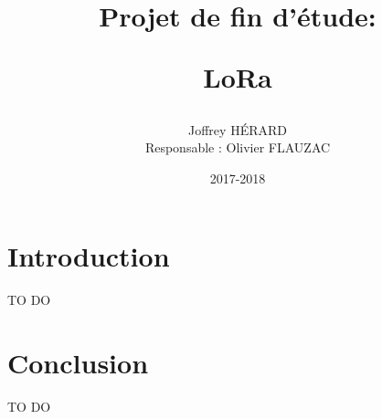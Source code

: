 \documentclass[11pt]{article}
\begin{document}
\lstset{language=Java}
 \makeatletter
\def\maketitle{%
  \null
  \thispagestyle{empty}%
   \vfill
  \begin{center}\leavevmode
    \normalfont
    {\Huge \@title\par}%
    \vskip 3cm
    {\Large \@author\par}%
    \vskip 1cm
    {\Large \@date\par}%
  \end{center}%
  \vfill
  \null
  \cleardoublepage
  }
\makeatother
\title{\begin{center}Projet de fin d'étude:\end{center} LoRa }
\author{ Joffrey HÉRARD 
\begin{center}Responsable : Olivier FLAUZAC\end{center}}
\date{2017-2018}
\maketitle 
 
\tableofcontents 

\setlength{\parskip}{0.5em}
\newpage
\section{Introduction}
TO DO 

\newpage
\section{Conclusion}
TO DO 
\end{document}
